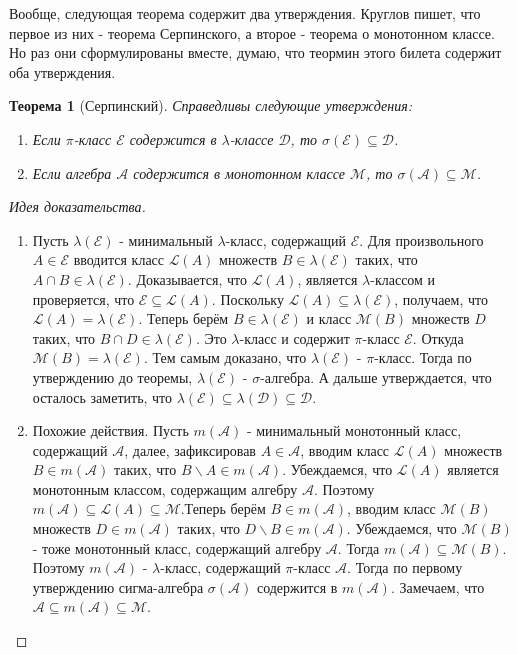 \documentclass[16pt]{article}
\newtheorem{theorem}{Теорема}[section]
\theoremstyle{definition}
\begin{document}
Вообще, следующая теорема содержит два утверждения. Круглов пишет, что первое из них - теорема Серпинского, а второе - теорема о монотонном классе. Но раз они сформулированы вместе, думаю, что теормин этого билета содержит оба утверждения.
\begin{theorem}[Серпинский]
Справедливы следующие утверждения:
\begin{enumerate}
    \item Если $\pi$-класс $\mathcal{E}$ содержится в $\lambda$-классе $\mathcal{D}$, то $\sigma(\mathcal{E}) \subseteq \mathcal{D}$.
    \item Если алгебра $\mathcal{A}$ содержится в монотонном классе $\mathcal{M}$, то $\sigma(\mathcal{A}) \subseteq \mathcal{M}$. 
\end{enumerate}
\end{theorem}
\begin{proof}[Идея доказательства]
\begin{enumerate}
    \item Пусть $\lambda(\mathcal{E})$ - минимальный $\lambda$-класс, содержащий $\mathcal{E}$. Для произвольного $A \in \mathcal{E}$ вводится класс $\mathcal{L}(A)$ множеств $B \in \lambda(\mathcal{E})$ таких, что $A \cap B \in \lambda(\mathcal{E})$. Доказывается, что $\mathcal{L}(A)$, является $\lambda$-классом и проверяется, что $\mathcal{E} \subseteq \mathcal{L}(A)$. Поскольку $\mathcal{L}(A) \subseteq \lambda(\mathcal{E})$, получаем, что $\mathcal{L}(A) = \lambda(\mathcal{E})$. \newline Теперь берём $B \in \lambda(\mathcal{E})$ и класс $\mathcal{M}(B)$ множеств $D$ таких, что $B \cap D \in \lambda(\mathcal{E})$. Это $\lambda$-класс и содержит $\pi$-класс $\mathcal{E}$. Откуда $\mathcal{M}(B) = \lambda(\mathcal{E})$. Тем самым доказано, что $\lambda(\mathcal{E})$ - $\pi$-класс. Тогда по утверждению до теоремы, $\lambda(\mathcal{E})$ - $\sigma$-алгебра. А дальше утверждается, что осталось заметить, что $\lambda(\mathcal{E}) \subseteq \lambda(\mathcal{D}) \subseteq \mathcal{D}$. 
    \item Похожие действия. Пусть $m(\mathcal{A})$ - минимальный монотонный класс, содержащий $\mathcal{A}$, далее, зафиксировав $A \in \mathcal{A}$, вводим класс $\mathcal{L}(A)$ множеств $B \in m(\mathcal{A})$ таких, что $B \backslash A \in m(\mathcal{A})$. Убеждаемся, что $\mathcal{L}(A)$ является монотонным классом, содержащим алгебру $\mathcal{A}$. Поэтому $m(\mathcal{A}) \subseteq \mathcal{L}(A) \subseteq \mathcal{M}$.\newline Теперь берём $B \in m(\mathcal{A})$, вводим класс $\mathcal{M}(B)$ множеств $D \in m(\mathcal{A})$ таких, что $D \backslash B \in m(\mathcal{A})$. Убеждаемся, что $\mathcal{M}(B)$ - тоже монотонный класс, содержащий алгебру $\mathcal{A}$. Тогда $m(\mathcal{A}) \subseteq \mathcal{M}(B)$. Поэтому $m(\mathcal{A})$ - $\lambda$-класс, содержащий $\pi$-класс $\mathcal{A}$. Тогда по первому утверждению сигма-алгебра $\sigma(\mathcal{A})$ содержится в $m(\mathcal{A})$. Замечаем, что $\mathcal{A} \subseteq m(\mathcal{A}) \subseteq \mathcal{M}$. 
\end{enumerate}
\end{proof}
\end{document}
